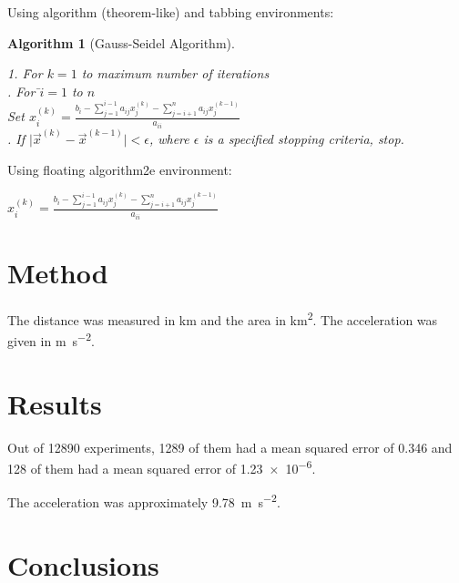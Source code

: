 \documentclass[oneside,12pt]{scrbook}
\theoremstyle{break}
\newtheorem{algorithm}[algocf]{Algorithm}
\begin{document}
Using algorithm (theorem-like) and tabbing environments:

\begin{algorithm}[Gauss-Seidel Algorithm]
\begin{tabbing}
1. \=For $k=1$ to maximum number of iterations\\
. For \=$i=1$ to $n$\\
\>\>Set
\begin{math}
x_i^{(k)} =
\frac{b_i-\sum_{j=1}^{i-1}a_{ij}x_j^{(k)}
-\sum_{j=i+1}^{n}a_{ij}x_j^{(k-1)}}%
{a_{ii}}
\end{math}
\\
. If $\lvert\vec{x}^{(k)}-\vec{x}^{(k-1)}\rvert < \epsilon$,
where $\epsilon$ is a specified stopping criteria, stop.
\end{tabbing}
\end{algorithm}

Using floating algorithm2e environment:

\begin{algorithm2e}
\caption{Gauss-Seidel Algorithm}\label{alg:gauss-seidel}
{
   {
     $
      x_i^{(k)} =
      \frac{b_i-\sum_{j=1}^{i-1}a_{ij}x_j^{(k)}
      -\sum_{j=i+1}^{n}a_{ij}x_j^{(k-1)}}%
      {a_{ii}}
      $\;
   }
}
\end{algorithm2e}


\chapter{Method}
\label{ch:method}

The distance was measured in \si{\kilo\metre} and the area in
\si{\kilo\metre\squared}. The acceleration was given in
\si{\metre\per\square\second}.

\chapter{Results}
\label{ch:results}

Out of \num{12890} experiments, \num{1289} of them had a mean
squared error of \num{.346} and \num{128} of them had a mean
squared error of \num{1.23e-6}.

The acceleration was approximately
\SI{9.78}{\metre\per\square\second}.


\chapter{Conclusions}
\label{ch:conc}


\backmatter




\end{document}
